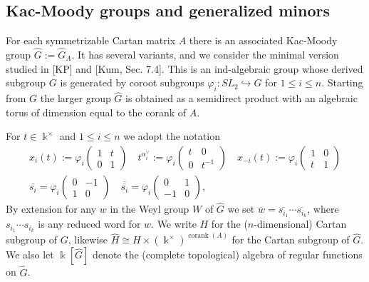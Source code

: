 \documentclass[12pt]{amsart}
\newcommand{\sayDR}[1]{\say[DR]{\color{red}{\bf DR:}\;#1}}
\newcommand{\kk}{\Bbbk}%
\newcommand\into{\hookrightarrow}
\DeclareMathOperator{\corank}{corank}
\newcommand{\ol}[1]{\overline{#1}}
\newcommand{\dol}[1]{\overline{\overline{#1}}}
\theoremstyle{remark}
\numberwithin{equation}{section}
\begin{document}
\subsection{Kac-Moody groups and generalized minors}

For each symmetrizable Cartan matrix $A$ there is an associated Kac-Moody group $\widehat{G}:=\widehat{G}_A$. 
It has several variants, and we consider the minimal version studied in [KP] and [Kum, Sec. 7.4]. 
This is an ind-algebraic group whose derived subgroup $G$ is generated by coroot subgroups $\varphi_i: SL_2 \into G$ for $1 \leq i \leq n$. Starting from $G$ the larger group $\widehat{G}$ is obtained as a semidirect product with an algebraic torus of dimension equal to the corank of $A$.

For $t \in \kk^\times$ and $1 \leq i \leq n$ we adopt the notation 
\begin{gather}
x_{i}(t):=\varphi_i\begin{pmatrix} 1 & t \\ 0 & 1\end{pmatrix} \quad  
t^{\alpha_i^\vee}:=\varphi_i\begin{pmatrix}t & 0 \\ 0 & t^{-1}\end{pmatrix} \quad
x_{-i}(t):=\varphi_i\begin{pmatrix} 1 & 0 \\ t & 1\end{pmatrix} \\
\ol{s_{i}} = \varphi_i \begin{pmatrix} 0 & -1 \\ 1 & 0 \end{pmatrix} \quad
\dol{s_{i}} = \varphi_i \begin{pmatrix} 0 & 1 \\ -1 & 0 \end{pmatrix},
\end{gather}\sayDR{Are the $\dol{s_{i}}$ needed?}
By extension for any $w$ in the Weyl group $W$ of $\widehat{G}$ we set $\ol{w} = \ol{s_{i_1}}\cdots\ol{s_{i_k}}$, where $s_{i_1}\cdots s_{i_k}$ is any reduced word for $w$. 
We write $H$ for the ($n$-dimensional) Cartan subgroup of $G$, likewise $\widehat{H} \cong H \times (\kk^\times)^{\corank(A)}$ for the Cartan subgroup of $\widehat{G}$. We also let $\kk[\widehat{G}]$ denote the (complete topological) algebra of regular functions on $\widehat{G}$.
\end{document}
